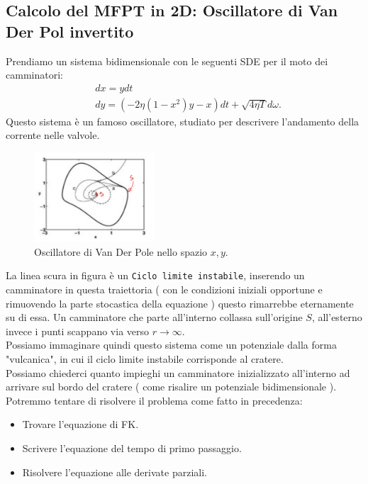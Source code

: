 \subsection{Calcolo del MFPT in 2D: Oscillatore di Van Der Pol invertito}%
\label{sub:Calcolo del MFPT in 2D}
Prendiamo un sistema bidimensionale con le seguenti SDE per il moto dei camminatori:
\[\begin{aligned}
    & dx = ydt\\
    & dy = \left(-2\eta (1-x^2) y - x\right)dt + \sqrt{ 4\eta T} d\omega
.\end{aligned}\]
Questo sistema è un famoso oscillatore, studiato per descrivere l'andamento della corrente nelle valvole.
\begin{figure}[H]
    \centering
    \includegraphics[width=0.4\textwidth]{figures/lez_12_Van_Der_Pol_oscillator.png}
    \caption{\scriptsize Oscillatore di Van Der Pole nello spazio $x, y$.}
    \label{fig:figures-lez_12_Van_Der_Pol_oscillator-png}
\end{figure}
\noindent
La linea scura in figura è un \texttt{Ciclo limite instabile}, inserendo un camminatore in questa traiettoria ( con le condizioni iniziali opportune e rimuovendo la parte stocastica della equazione ) questo rimarrebbe eternamente su di essa. Un camminatore che parte all'interno collassa sull'origine $S$, all'esterno invece i punti scappano via verso $r\to \infty$.\\
Possiamo immaginare quindi questo sistema come un potenziale dalla forma "vulcanica", in cui il ciclo limite instabile corrisponde al cratere.\\
Possiamo chiederci quanto impieghi un camminatore inizializzato all'interno ad arrivare sul bordo del cratere ( come risalire un potenziale bidimensionale ).\\
Potremmo tentare di risolvere il problema come fatto in precedenza:
\begin{itemize}
    \item Trovare l'equazione di FK.
    \item Scrivere l'equazione del tempo di primo passaggio.
    \item Risolvere l'equazione alle derivate parziali.
\end{itemize}
